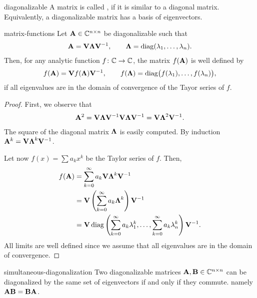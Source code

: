\begin{Definition}{diagonalizable}
  A matrix is called , if it is similar to a diagonal matrix.
  Equivalently, a diagonalizable matrix has a basis of eigenvectors.
\end{Definition}

\begin{Theorem}{matrix-functions}
  Let $\mathbf A\in \mathbb C^{n\times n}$ be diagonalizable such that
  \begin{gather}
    \mathbf A = \mathbf V \boldsymbol\Lambda \mathbf V^{-1},
    \qquad \boldsymbol\Lambda = \operatorname{diag}(\lambda_1,\dots,\lambda_n).
  \end{gather}
  Then, for any analytic function $f\colon \mathbb C \to \mathbb C$, the matrix
  $f(\mathbf A)$ is well defined by
  \begin{gather}
    f(\mathbf A) = \mathbf V f(\boldsymbol\Lambda) \mathbf V^{-1},
    \qquad f(\boldsymbol\Lambda) = \operatorname{diag}\bigl(f(\lambda_1),\dots,f(\lambda_n)\bigr),
  \end{gather}
  if all eigenvalues are in the domain of convergence of the Tayor
  series of $f$.
\end{Theorem}

\begin{proof}
  First, we observe that
  \begin{gather}
    \mathbf A^2 = \mathbf V \boldsymbol\Lambda \mathbf V^{-1} \mathbf V \boldsymbol\Lambda \mathbf V^{-1}
    = \mathbf V \boldsymbol\Lambda^2 \mathbf V^{-1}.
  \end{gather}
  The square of the diagonal matrix $\boldsymbol\Lambda$ is easily computed.
  By induction $\mathbf A^k =  \mathbf V \boldsymbol\Lambda^k \mathbf V^{-1}$.

  Let now $f(x) = \sum a_k x^k$ be the Taylor series of $f$. Then,
  \begin{gather}
    \begin{split}
      f(\mathbf A)
      &= \sum_{k=0}^\infty a_k  \mathbf V \boldsymbol\Lambda^k \mathbf V^{-1}\\
      &= \mathbf V \left(\sum_{k=0}^\infty a_k \boldsymbol\Lambda^k\right) \mathbf V^{-1}\\
      &= \mathbf V \operatorname{diag}\left(
        \sum_{k=0}^\infty a_k \lambda_1^k,\dots,
        \sum_{k=0}^\infty a_k\lambda_n^k
      \right)  \mathbf V^{-1}.
    \end{split}
  \end{gather}
  All limits are well defined since we assume that all eigenvalues are
  in the domain of convergence.
\end{proof}

\begin{Theorem}{simultaneous-diagonalization}
  Two diagonalizable matrices $\mathbf A, \mathbf B\in \mathbb C^{n\times n}$ can be
  diagonalized by the same set of eigenvectors if and only if they
  commute. namely $\mathbf A\mathbf B = \mathbf B\mathbf A$.
\end{Theorem}

